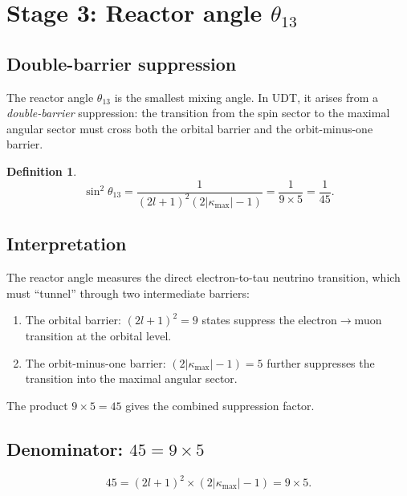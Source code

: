 \documentclass[11pt,letterpaper]{article}
\newtheorem{definition}[theorem]{Definition}
\numberwithin{equation}{section}
\begin{document}
\section{Stage 3: Reactor angle $\theta_{13}$}
\label{sec:theta13}

\subsection{Double-barrier suppression}

The reactor angle $\theta_{13}$ is the smallest mixing angle. In UDT, it
arises from a \emph{double-barrier} suppression: the transition from the
spin sector to the maximal angular sector must cross both the orbital
barrier and the orbit-minus-one barrier.

\begin{definition}
\begin{equation}
\label{eq:sin2_13}
\boxed{
  \sin^2\theta_{13} = \frac{1}{(2l+1)^2(2|\kappa_\mathrm{max}|-1)}
  = \frac{1}{9 \times 5} = \frac{1}{45}.
}
\end{equation}
\end{definition}

\subsection{Interpretation}

The reactor angle measures the direct electron-to-tau neutrino transition,
which must ``tunnel'' through two intermediate barriers:
\begin{enumerate}
  \item The orbital barrier: $(2l+1)^2 = 9$ states suppress the
    electron$\to$muon transition at the orbital level.
  \item The orbit-minus-one barrier: $(2|\kappa_\mathrm{max}|-1) = 5$ further
    suppresses the transition into the maximal angular sector.
\end{enumerate}

The product $9 \times 5 = 45$ gives the combined suppression factor.

\subsection{Denominator: $45 = 9 \times 5$}

\begin{equation}
  45 = (2l+1)^2 \times (2|\kappa_\mathrm{max}|-1) = 9 \times 5.
\end{equation}
\end{document}
